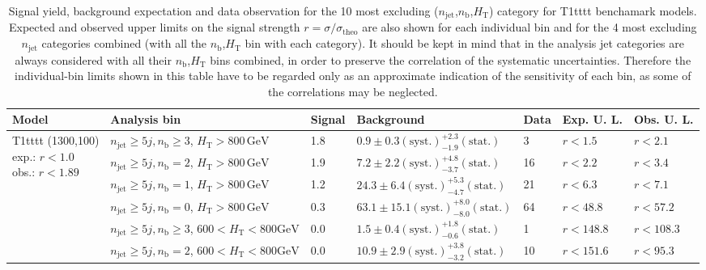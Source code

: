 \begin{table}[h!] 
  \scriptsize
  \caption{ 
  Signal yield, background expectation and data observation for the 10 most excluding ($n_{\mathrm{jet}}$,$n_{\mathrm{b}}$,$H_{\mathrm{T}}$) category for T1tttt benchamark models. 
  Expected and observed upper limits on the signal strength $r=\sigma/\sigma_{\mathrm{theo}}$ are also shown 
  for each individual bin and for the 4 most excluding $n_{\mathrm{jet}}$ categories combined (with all the $n_{\mathrm{b}}$,$H_{\mathrm{T}}$ bin with each category).
  It should be kept in mind that in the analysis jet categories are always considered with all their $n_{\mathrm{b}}$,$H_{\mathrm{T}}$ bins 
  combined, in order to preserve the correlation of the systematic uncertainties. 
  Therefore the individual-bin limits shown in this table have to be regarded only as an approximate indication 
  of the sensitivity of each bin, as some of the correlations may be neglected.
  \label{tab:sigBenchmarksYields_T1tttt}}
  \centering 
  \begin{tabular}{ lllllll } 
    \hline 
    \hline 
    Model & Analysis bin & Signal & Background & Data & Exp. U. L. & Obs. U. L. \\ \hline
\multirow{10}{*}{\parbox[t]{2cm}{T1tttt (1300,100)\\exp.: $r<1.0$\\obs.: $r<1.89$}}
 & $n_{\mathrm{jet}} \geq5j,n_{\mathrm{b}} \geq3$, $H_{\mathrm{T}} > 800 \, \mathrm{GeV}$ & 1.8 & $0.9 \pm 0.3 \mathrm{(syst.)} ^{+2.3}_{-1.9} \mathrm{(stat.)}$ & 3 & $r < 1.5$ & $r < 2.1$\\ 
 & $n_{\mathrm{jet}} \geq5j,n_{\mathrm{b}} =2$, $H_{\mathrm{T}} > 800 \, \mathrm{GeV}$ & 1.9 & $7.2 \pm 2.2 \mathrm{(syst.)} ^{+4.8}_{-3.7} \mathrm{(stat.)}$ & 16 & $r < 2.2$ & $r < 3.4$\\ 
 & $n_{\mathrm{jet}} \geq5j,n_{\mathrm{b}} =1$, $H_{\mathrm{T}} > 800 \, \mathrm{GeV}$ & 1.2 & $24.3 \pm 6.4 \mathrm{(syst.)} ^{+5.3}_{-4.7} \mathrm{(stat.)}$ & 21 & $r < 6.3$ & $r < 7.1$\\ 
 & $n_{\mathrm{jet}} \geq5j,n_{\mathrm{b}} =0$, $H_{\mathrm{T}} > 800 \, \mathrm{GeV}$ & 0.3 & $63.1 \pm 15.1 \mathrm{(syst.)} ^{+8.0}_{-8.0} \mathrm{(stat.)}$ & 64 & $r < 48.8$ & $r < 57.2$\\ 
 & $n_{\mathrm{jet}} \geq5j,n_{\mathrm{b}} \geq3$, $600 < H_{\mathrm{T}} < 800 \mathrm{GeV}$ & 0.0 & $1.5 \pm 0.4 \mathrm{(syst.)} ^{+1.8}_{-0.6} \mathrm{(stat.)}$ & 1 & $r < 148.8$ & $r < 108.3$\\ 
 & $n_{\mathrm{jet}} \geq5j,n_{\mathrm{b}} =2$, $600 < H_{\mathrm{T}} < 800 \mathrm{GeV}$ & 0.0 & $10.9 \pm 2.9 \mathrm{(syst.)} ^{+3.8}_{-3.2} \mathrm{(stat.)}$ & 10 & $r < 151.6$ & $r < 95.3$\\ 

\end{tabular}
\end{table}
